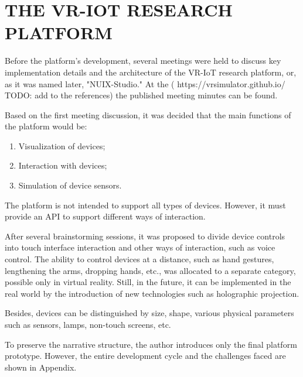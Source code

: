 
\chapter{THE VR-IOT RESEARCH PLATFORM}

Before the platform's development, several meetings were held to discuss key implementation details and the architecture of the VR-IoT research platform, or, as it was named later, "NUIX-Studio." At the ( https://vrsimulator.github.io/ TODO: add to the references) the published meeting minutes can be found. 

Based on the first meeting discussion, it was decided that the main functions of the platform would be:
\begin{enumerate}
     \item Visualization of devices;
     \item Interaction with devices;
     \item Simulation of device sensors.
\end{enumerate}

The platform is not intended to support all types of devices. However, it must provide an API to support different ways of interaction.

After several brainstorming sessions, it was proposed to divide device controls into touch interface interaction and other ways of interaction, such as voice control. The ability to control devices at a distance, such as hand gestures, lengthening the arms, dropping hands, etc., was allocated to a separate category, possible only in virtual reality. Still, in the future, it can be implemented in the real world by the introduction of new technologies such as holographic projection.

Besides, devices can be distinguished by size, shape, various physical parameters such as sensors, lamps, non-touch screens, etc.

To preserve the narrative structure, the author introduces only the final platform prototype. However, the entire development cycle and the challenges faced are shown in Appendix.

